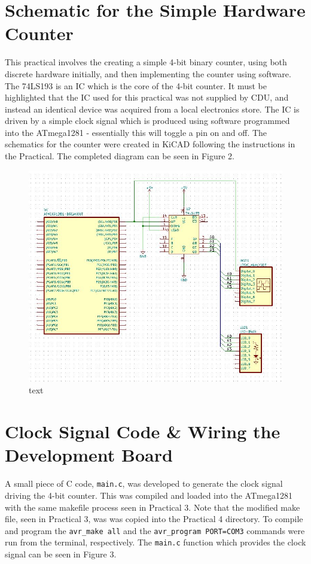 \documentclass[a4paper]{article}
\begin{document}
\section{Schematic for the Simple Hardware Counter}
This practical involves the creating a simple 4-bit binary counter, using both discrete hardware initially, and then implementing the counter using software. The 74LS193 is an IC which is the core of the 4-bit counter. It must be highlighted that the IC used for this practical was not supplied by CDU, and instead an identical device was acquired from a local electronics store. The IC is driven by a simple clock signal which is produced using software programmed into the ATmega1281 - essentially this will toggle a pin on and off. The schematics for the counter were created in KiCAD following the instructions in the Practical. The completed diagram can be seen in Figure 2.

\begin{figure}[h]
	\centering
	\includegraphics[scale=0.7]{fig2}
	\caption{text}
\end{figure}

\section{Clock Signal Code \& Wiring the Development Board}
A small piece of C code, \verb|main.c|, was developed to generate the clock signal driving the 4-bit counter. This was compiled and loaded into the ATmega1281 with the same makefile process seen in Practical 3. Note that the modified make file, seen in Practical 3, was was copied into the Practical 4 directory. To compile and program the \verb|avr_make all| and the \verb|avr_program PORT=COM3| commands were run from the terminal, respectively. The \verb|main.c| function which provides the clock signal can be seen in Figure 3.
\end{document}
